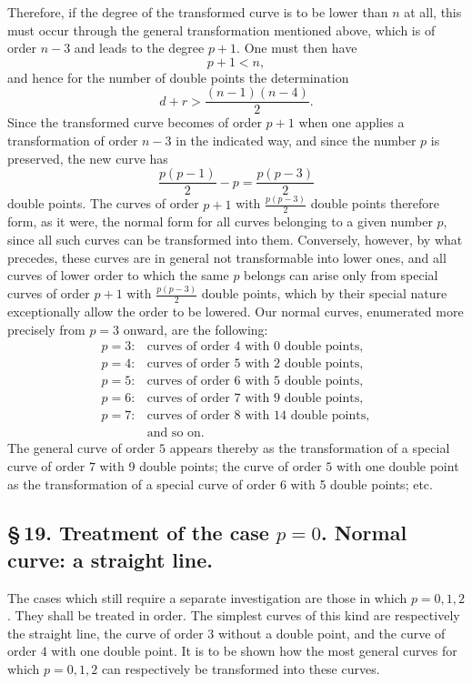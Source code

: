 \documentclass[10pt]{article}
\begin{document}
Therefore, if the degree of the transformed curve is to be lower than \(n\) at all, this must occur through the general transformation mentioned above, which is of order \(n-3\) and leads to the degree \(p+1\). One must then have
\[
p+1<n,
\]
and hence for the number of double points the determination
\[
d+r>\frac{(n-1)(n-4)}{2}.
\]
Since the transformed curve becomes of order \(p+1\) when one applies a transformation of order \(n-3\) in the indicated way, and since the number \(p\) is preserved, the new curve has
\[
\frac{p(p-1)}{2}-p=\frac{p(p-3)}{2}
\]
double points. The curves of order \(p+1\) with \(\frac{p(p-3)}{2}\) double points therefore form, as it were, the normal form for all curves belonging to a given number \(p\), since all such curves can be transformed into them. Conversely, however, by what precedes, these curves are in general not transformable into lower ones, and all curves of lower order to which the same \(p\) belongs can arise only from special curves of order \(p+1\) with \(\frac{p(p-3)}{2}\) double points, which by their special nature exceptionally allow the order to be lowered. Our normal curves, enumerated more precisely from \(p=3\) onward, are the following:
\[
\begin{array}{ll}
p=3:& \text{curves of order }4\text{ with }0\text{ double points},\\
p=4:& \text{curves of order }5\text{ with }2\text{ double points},\\
p=5:& \text{curves of order }6\text{ with }5\text{ double points},\\
p=6:& \text{curves of order }7\text{ with }9\text{ double points},\\
p=7:& \text{curves of order }8\text{ with }14\text{ double points},\\
&\text{and so on.}
\end{array}
\]
The general curve of order \(5\) appears thereby as the transformation of a special curve of order \(7\) with 9 double points; the curve of order \(5\) with one double point as the transformation of a special curve of order \(6\) with 5 double points; etc.


\subsection*{\S\,19. Treatment of the case \(p=0\). Normal curve: a straight line.}

The cases which still require a separate investigation are those in which \(p=0,1,2\). They shall be treated in order. The simplest curves of this kind are respectively the straight line, the curve of order \(3\) without a double point, and the curve of order \(4\) with one double point. It is to be shown how the most general curves for which \(p=0,1,2\) can respectively be transformed into these curves.
\end{document}
